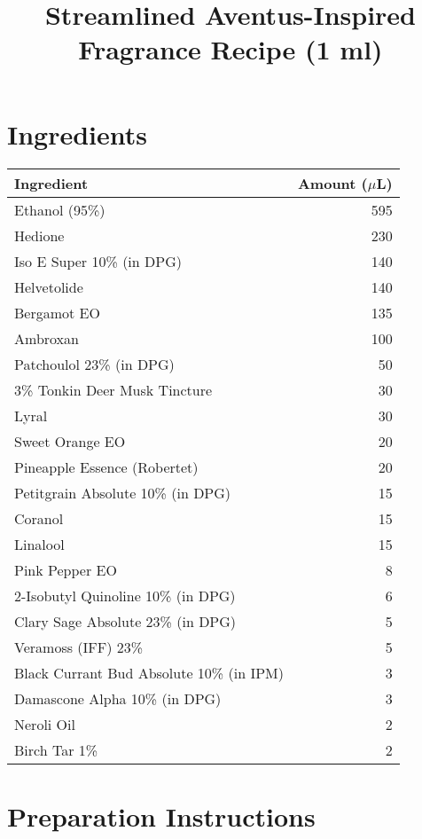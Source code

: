 \documentclass{article}
\title{Streamlined Aventus-Inspired Fragrance Recipe (1 ml)}
\author{}
\date{}
\begin{document}
\maketitle

\section{Ingredients}

\begin{table}[h]
\centering
\begin{tabular}{lr}
\toprule
\textbf{Ingredient} & \textbf{Amount ($\mu$L)} \\
\midrule
Ethanol (95\%) & 595 \\
Hedione & 230 \\
Iso E Super 10\% (in DPG) & 140 \\
Helvetolide & 140 \\
Bergamot EO & 135 \\
Ambroxan & 100 \\
Patchoulol 23\% (in DPG) & 50 \\
3\% Tonkin Deer Musk Tincture & 30 \\
Lyral & 30 \\
Sweet Orange EO & 20 \\
Pineapple Essence (Robertet) & 20 \\
Petitgrain Absolute 10\% (in DPG) & 15 \\
Coranol & 15 \\
Linalool & 15 \\
Pink Pepper EO & 8 \\
2-Isobutyl Quinoline 10\% (in DPG) & 6 \\
Clary Sage Absolute 23\% (in DPG) & 5 \\
Veramoss (IFF) 23\% & 5 \\
Black Currant Bud Absolute 10\% (in IPM) & 3 \\
Damascone Alpha 10\% (in DPG) & 3 \\
Neroli Oil & 2 \\
Birch Tar 1\% & 2 \\
\bottomrule
\end{tabular}
\end{table}

\section{Preparation Instructions}
\end{document}

